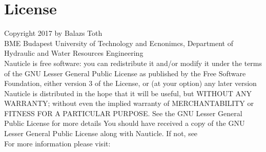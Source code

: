 \documentclass[a4paper,12pt,openany]{book}
\newcommand{\myhref}[3][nauticlegreen_dark]{\href{#2}{\color{#1}{#3}}}%
\theoremstyle{break}
\begin{document}
\section{License}
\noindent
Copyright \textcopyright{} 2017 by Balazs Toth \\
\noindent
BME Budapest University of Technology and Ecnonimcs, Department of Hydraulic and Water Resources Engineering\\

Nauticle is free software: you can redistribute it and/or modify it under the terms of the GNU Lesser General Public License as published by the Free Software Foundation, either version 3 of the License, or (at your option) any later version Nauticle is distributed in the hope that it will be useful, but WITHOUT ANY WARRANTY; without even the implied warranty of MERCHANTABILITY or FITNESS FOR A PARTICULAR PURPOSE.  See the GNU Lesser General Public License for more details You should have received a copy of the GNU Lesser General Public License along with Nauticle.  If not, see \myhref{http://www.gnu.org/licenses/}{http://www.gnu.org/licenses/}\\
 For more information please visit: \myhref{https://bitbucket.org/Nauticleproject/}{https://bitbucket.org/Nauticleproject/}
\end{document}
